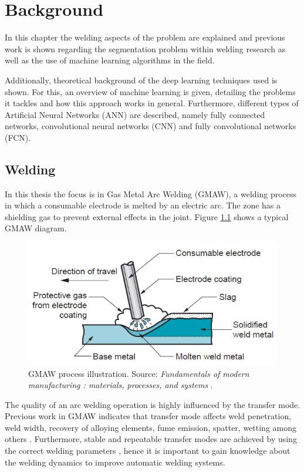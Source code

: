 \chapter{Background}\label{chap:background}

In this chapter the welding aspects of the problem are explained and previous work is shown regarding the segmentation problem within welding research as well as the use of machine learning algorithms in the field.

Additionally, theoretical background of the deep learning techniques used is shown. For this, an overview of machine learning is given, detailing the problems it tackles and how this approach works in general. Furthermore, different types of Artificial Neural Networks (ANN) are described, namely fully connected networks, convolutional neural networks (CNN) and fully convolutional networks (FCN). 

\section{Welding}

In this thesis the focus is in Gas Metal Arc Welding (GMAW), a welding process in which a consumable electrode is melted by an electric arc. The zone has a shielding gas to prevent external effects in the joint. Figure \ref{fig:gmaw} shows a typical GMAW diagram.

\begin{figure}
    \centering
    \includegraphics{Images/Background/gmaw.png}
    \caption[Illustration of a GMAW process]{GMAW process illustration. Source: \textit{Fundamentals of modern manufacturing : materials, processes, and systems} \cite{grover}.}
    \label{fig:gmaw}
\end{figure}

The quality of an arc welding operation is highly influenced by the transfer mode. Previous work in GMAW indicates that transfer mode affects weld penetration, weld width, recovery of alloying elements, fume emission, spatter, wetting among others \cite{lancaster, mendez2015}. Furthermore, stable and repeatable transfer modes are achieved by using the correct welding parameters \cite{zhang2}, hence it is important to gain knowledge about the welding dynamics to improve automatic welding systems.

